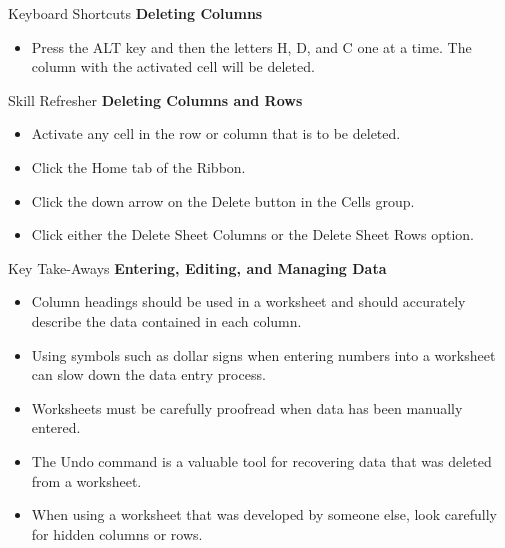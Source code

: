 \begin{center}
	\begin{shtcutbox}{Keyboard Shortcuts}
		\textbf{Deleting Columns}
		\\
		\begin{itemize}
			\setlength{\itemsep}{0pt}
			\setlength{\parskip}{0pt}
			\setlength{\parsep}{0pt}
			
			\item Press the ALT key and then the letters H, D, and C one at a time. The column with the activated cell will be deleted.
			
		\end{itemize}
	\end{shtcutbox}
\end{center}

\begin{center}
	\begin{sklbox}{Skill Refresher}
		\textbf{Deleting Columns and Rows}
		\\
		\begin{itemize}
			\setlength{\itemsep}{0pt}
			\setlength{\parskip}{0pt}
			\setlength{\parsep}{0pt}
			
			\item Activate any cell in the row or column that is to be deleted.
			\item Click the Home tab of the Ribbon.
			\item Click the down arrow on the Delete button in the Cells group.
			\item Click either the Delete Sheet Columns or the Delete Sheet Rows option.
			
		\end{itemize}
	\end{sklbox}
\end{center}

\begin{center}
	\begin{tkwbox}{Key Take-Aways}
		\textbf{Entering, Editing, and Managing Data}
		\\
		\begin{itemize}
			\setlength{\itemsep}{0pt}
			\setlength{\parskip}{0pt}
			\setlength{\parsep}{0pt}
			
			\item Column headings should be used in a worksheet and should accurately describe the data contained in each column.
			\item Using symbols such as dollar signs when entering numbers into a worksheet can slow down the data entry process.
			\item Worksheets must be carefully proofread when data has been manually entered.
			\item The Undo command is a valuable tool for recovering data that was deleted from a worksheet.
			\item When using a worksheet that was developed by someone else, look carefully for hidden columns or rows.
			
		\end{itemize}
	\end{tkwbox}
\end{center}

